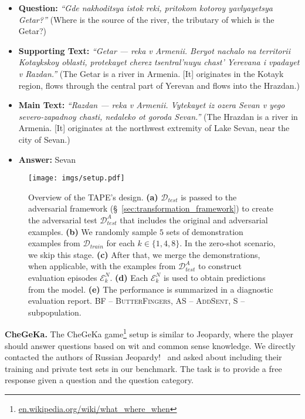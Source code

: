 \documentclass[11pt]{article}
\begin{document}
\begin{itemize}[noitemsep,leftmargin=1.em]
\item \textbf{Question:} \textit{``Gde nakhoditsya istok reki, pritokom kotoroy yavlyayetsya Getar?''} (Where is the source of the river, the tributary of which is the Getar?)
\item \textbf{Supporting Text:} \textit{``Getar — reka v Armenii. Beryot nachalo na territorii Kotaykskoy oblasti, protekayet cherez tsentral'nuyu chast' Yerevana i vpadayet v Razdan.''} (The Getar is a river in Armenia. [It] originates in the Kotayk region, flows through the central part of Yerevan and flows into the Hrazdan.)\item \textbf{Main Text:} \textit{``Razdan — reka v Armenii. Vytekayet iz ozera \colorbox{cb-salmon-pink}{Sevan} v yego severo-zapadnoy chasti, nedaleko ot goroda Sevan.''} (The Hrazdan is a river in Armenia. [It] originates at the northwest extremity of Lake Sevan, near the city of Sevan.) \item \textbf{Answer:} Sevan\end{itemize} 
\begin{figure*}[!ht]
\centering
\texttt{[image: imgs/setup.pdf]}
\caption{Overview of the TAPE's design. \textbf{(a)} $\mathcal{D}_{test}$ is passed to the adversarial framework (\S~\ref{sec:transformation_framework}) to create the adversarial test $\mathcal{D}^{A}_{test}$ that includes the original and adversarial examples. \textbf{(b)} We randomly sample $5$ sets of demonstration examples from $\mathcal{D}_{train}$ for each $k \in \{1, 4, 8\}$. In the zero-shot scenario, we skip this stage. \textbf{(c)} After that, we merge the demonstrations, when applicable, with the examples from $\mathcal{D}^{A}_{test}$ to construct evaluation episodes $\mathcal{E}^{N}_k$. \textbf{(d)} Each $\mathcal{E}^{N}_k$ is used to obtain predictions from the model. \textbf{(e)} The performance is summarized in a diagnostic evaluation report. BF -- \textsc{ButterFingers}, AS -- \textsc{AddSent}, S -- subpopulation. }
\label{fig:eval_setup}
\end{figure*}
 
\noindent\textbf{CheGeKa.}
\label{chegeka}
The CheGeKa game\footnote{\href{https://en.wikipedia.org/wiki/What\%3F_Where\%3F_When\%3F}{en.wikipedia.org/wiki/what\_where\_when}} setup is similar to Jeopardy, where the player should answer questions based on wit and common sense knowledge. We directly contacted the authors of Russian Jeopardy!~\cite{https://doi.org/10.48550/arxiv.2112.02325} and asked about including their training and private test sets in our benchmark. The task is to provide a free response given a question and the question category. 
\end{document}
